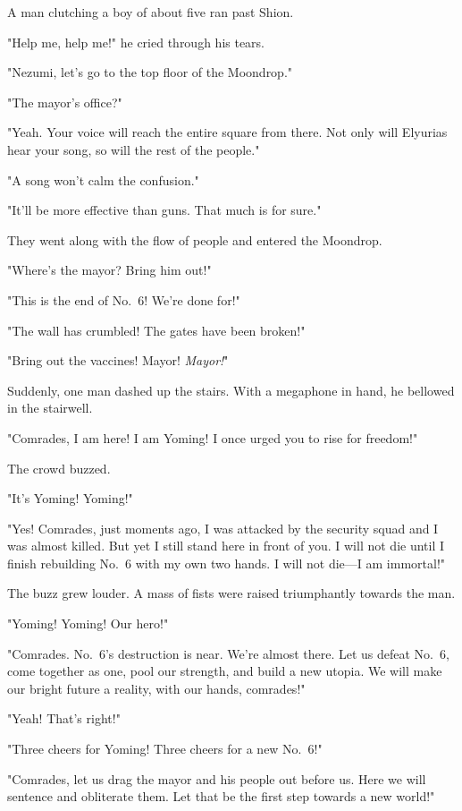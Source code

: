 

A man clutching a boy of about five ran past Shion.

"Help me, help me!" he cried through his tears.

"Nezumi, let's go to the top floor of the Moondrop."

"The mayor's office?"

"Yeah. Your voice will reach the entire square from there. Not only will
Elyurias hear your song, so will the rest of the people."

"A song won't calm the confusion."

"It'll be more effective than guns. That much is for sure."

They went along with the flow of people and entered the Moondrop.

"Where's the mayor? Bring him out!"

"This is the end of No.~6! We're done for!"

"The wall has crumbled! The gates have been broken!"

"Bring out the vaccines! Mayor! \emph{Mayor!}"

Suddenly, one man dashed up the stairs. With a megaphone in hand, he
bellowed in the stairwell.

"Comrades, I am here! I am Yoming! I once urged you to rise for
freedom!"

The crowd buzzed.

"It's Yoming! Yoming!"

"Yes! Comrades, just moments ago, I was attacked by the security squad
and I was almost killed. But yet I still stand here in front of you. I
will not die until I finish rebuilding No.~6 with my own two hands. I
will not die---I am immortal!"

The buzz grew louder. A mass of fists were raised triumphantly towards
the man.

"Yoming! Yoming! Our hero!"

"Comrades. No.~6's destruction is near. We're almost there. Let us
defeat No.~6, come together as one, pool our strength, and build a new
utopia. We will make our bright future a reality, with our hands,
comrades!"

"Yeah! That's right!"

"Three cheers for Yoming! Three cheers for a new No.~6!"

"Comrades, let us drag the mayor and his people out before us. Here we
will sentence and obliterate them. Let that be the first step towards a
new world!"

